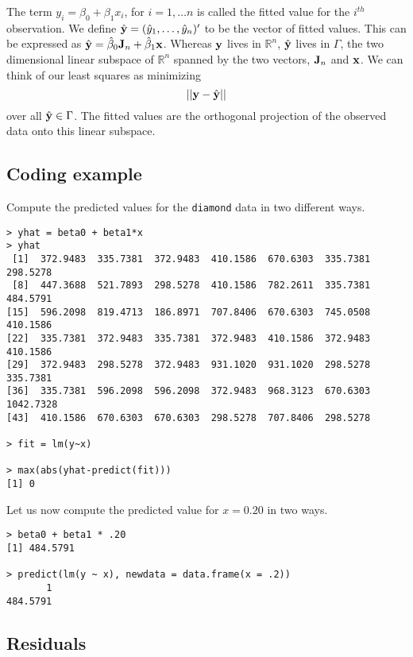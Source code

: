 The term $y_i = \beta_0 + \beta_1 x_i$, for $i = 1, \dots n$ is called the fitted value for the $i^{th}$ observation.
We define $\hat {\mathbf{y}} = (\hat y_1, \ldots, \hat y_n)'$ to be the vector of fitted values. 
This can be expressed as  $\hat {\mathbf{y}} = \hat \beta_0 {\bf J}_n+ \hat \beta_1 \mathbf{x}$.
Whereas $\mathbf{y}$ lives in $\mathbb{R}^n$, $\hat {\mathbf{y}}$ lives in $\Gamma$, the two dimensional
linear subspace of $\mathbb{R}^n$ spanned by the two vectors, $\mathbf{J}_n$ and $\mathbf{x}$. 
We can think of our least squares as minimizing 
$$
|| \mathbf{y} - \hat {\mathbf{y}}|| 
$$
over all $\hat {\mathbf{y}} \in \Gamma$. The fitted values are the orthogonal projection
of the observed data onto this linear subspace.

\subsection{Coding example}


Compute the predicted values for the \texttt{diamond} data in two different ways.
\begin{verbatim}
> yhat = beta0 + beta1*x
> yhat
 [1]  372.9483  335.7381  372.9483  410.1586  670.6303  335.7381  298.5278
 [8]  447.3688  521.7893  298.5278  410.1586  782.2611  335.7381  484.5791
[15]  596.2098  819.4713  186.8971  707.8406  670.6303  745.0508  410.1586
[22]  335.7381  372.9483  335.7381  372.9483  410.1586  372.9483  410.1586
[29]  372.9483  298.5278  372.9483  931.1020  931.1020  298.5278  335.7381
[36]  335.7381  596.2098  596.2098  372.9483  968.3123  670.6303 1042.7328
[43]  410.1586  670.6303  670.6303  298.5278  707.8406  298.5278

> fit = lm(y~x)

> max(abs(yhat-predict(fit)))
[1] 0

\end{verbatim}

Let us now compute the predicted value for $x=0.20$ in two ways.
\begin{verbatim}
> beta0 + beta1 * .20
[1] 484.5791

> predict(lm(y ~ x), newdata = data.frame(x = .2))
       1 
484.5791 
\end{verbatim}

\subsection{Residuals}

